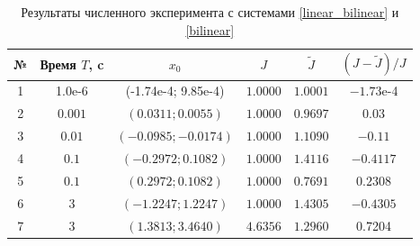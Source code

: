 \documentclass[../main.tex]{subfiles}
\begin{document}
	\begin{table}
	\caption{Результаты численного эксперимента с системами \eqref{linear_bilinear} и   \eqref{bilinear}}
	\label{Example2_table}
	\begin{center}
	\begin{tabular}{c|c|c|c|c|c}
	№       & Время $T$, c    &  $x_0$                  & $ J $                & $ \widetilde{J} $  & $  ( J -  \widetilde{J} ) / J$ \\ \hline
	1       & 1.0e-6          &  (-1.74e-4; 9.85e-4)    & $ 1.0000 $           & $ 1.0001 $         & $-1.73$e-4 \\ \hline %
	2       & $0.001 $        & $ (0.0311; 0.0055)  $   & $ 1.0000 $           & $ 0.9697 $         & $0.03$ \\ \hline %
	3       & $0.01 $         & $ (-0.0985; -0.0174) $  & $ 1.0000 $           & $ 1.1090 $         &  $-0.11$\\ \hline %
	4       & $0.1 $         & $ (-0.2972; 0.1082) $  & $ 1.0000 $           & $ 1.4116 $         &  $-0.4117$\\ \hline %
	5       & $0.1 $         & $ (0.2972; 0.1082) $  & $ 1.0000 $           & $ 0.7691  $         &  $0.2308$\\ \hline %
	6       & $ 3 $           & $ (-1.2247; 1.2247) $   & $1.0000 $            & $1.4305 $          &  $-0.4305$   \\ \hline %
	7       & $ 3 $           & $ (1.3813; 3.4640) $    & $4.6356 $            & $1.2960 $          & 0.7204
	\end{tabular}
	\end{center}
	\end{table} 
\end{document}

